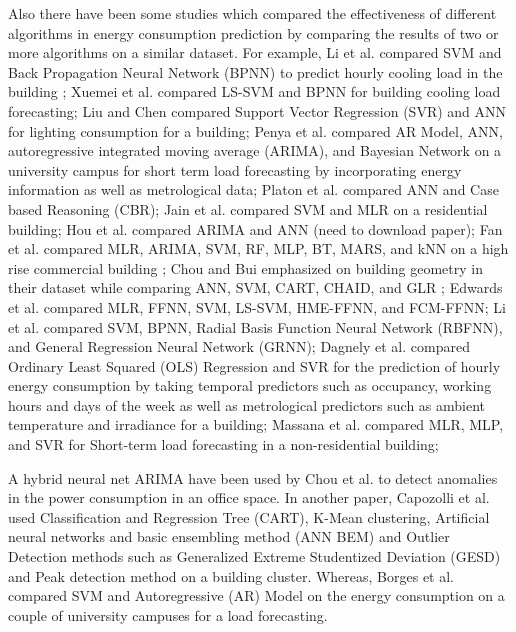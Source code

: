 \documentclass[conference]{IEEEtran}
\begin{document}
Also there have been some studies which compared the effectiveness of different algorithms in energy consumption prediction by comparing the results of two or more algorithms on a similar dataset. For example, Li et al. \cite{bb8} compared SVM and Back Propagation Neural Network (BPNN) to predict hourly cooling load in
the building ; %
 Xuemei et al. \cite{bb12}  compared LS-SVM and BPNN for building cooling load forecasting; Liu and Chen \cite{bb13}  compared Support Vector Regression (SVR) and ANN for lighting consumption for a building; Penya et al. \cite{bb14,bb25}  compared AR Model, ANN, autoregressive integrated moving average (ARIMA), and Bayesian Network on a university campus for short term load forecasting by incorporating energy information as well as metrological data; Platon et al. \cite{bb15}  compared ANN and Case based Reasoning (CBR); Jain et al. \cite{bb16} compared SVM and MLR on a residential building; Hou et al. \cite{bb17}  compared ARIMA and ANN (need to download paper);  Fan et al. \cite{bb18}  compared MLR, ARIMA, SVM, RF, MLP, BT, MARS, and kNN on a high rise commercial building ; Chou and Bui \cite{bb19} emphasized on building geometry in their dataset while comparing ANN, SVM, CART, CHAID, and GLR ; Edwards et al. \cite{bb20}  compared MLR, FFNN, SVM, LS-SVM, HME-FFNN, and FCM-FFNN; Li et al. \cite{bb21,bb22} compared SVM, BPNN, Radial Basis Function Neural Network (RBFNN), and General Regression Neural Network (GRNN); Dagnely et al. \cite{bb23} compared Ordinary Least Squared (OLS) Regression and SVR for the prediction of hourly energy consumption by taking temporal predictors such as occupancy, working hours and days of the week as well as metrological predictors such as ambient temperature and irradiance for a building; Massana et al. \cite{bb24} compared MLR, MLP, and SVR for Short-term load forecasting in a non-residential building; %

A hybrid neural net ARIMA have been used by Chou et al.\cite{bb29} to detect anomalies in the power consumption in an office space. In another paper, Capozolli et al. \cite{bb30} used Classification and Regression Tree (CART), K-Mean clustering, Artificial neural networks and basic ensembling method (ANN BEM) and Outlier Detection methods such as Generalized Extreme Studentized Deviation (GESD) and Peak detection method on a building cluster. Whereas, Borges et al. \cite{bb11} compared SVM and Autoregressive (AR) Model on the energy consumption on a couple of university campuses for a load forecasting. 
\end{document}
